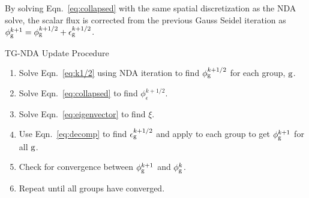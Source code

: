   By solving Eqn.~\eqref{eq:collapsed} with the same spatial discretization as the NDA solve, the scalar flux is corrected from the previous Gauss Seidel iteration as $\phi_{\mathrm{g}}^{k+1} = \phi_{\mathrm{g}}^{k+1/2} + \epsilon_{\mathrm{g}}^{k+1/2}$.

  TG-NDA Update Procedure
  \begin{enumerate}
      \item Solve Eqn.~\eqref{eq:k1/2} using NDA iteration to find $\phi_{\mathrm{g}}^{k+1/2}$ for each group, $\mathrm{g}$. 
      \item Solve Eqn.~\eqref{eq:collapsed} to find $\phi_\epsilon^{k+1/2}$. 
      \item Solve Eqn.~\eqref{eq:eigenvector} to find $\xi$. 
      \item Use Eqn.~\eqref{eq:decomp} to find $\epsilon_{\mathrm{g}}^{k+1/2}$ and apply to each group to get $\phi_{\mathrm{g}}^{k+1}$ for all $\mathrm{g}$. 
      \item Check for convergence between $\phi_{\mathrm{g}}^{k+1}$ and $\phi_{\mathrm{g}}^{k}$.
      \item Repeat until all groups have converged.
  \end{enumerate}
